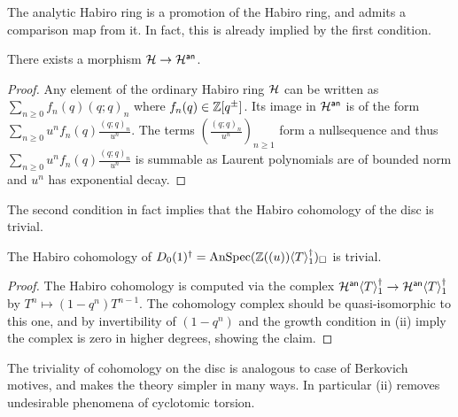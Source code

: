 The analytic Habiro ring is a promotion of the Habiro ring, and admits a comparison map from it. In fact, this is already implied by the first condition. 
\begin{lemma}\label{lem: map from Habiro to analytic Habiro}
    There exists a morphism $\mathcal{H}\to\mathcal{H}^{\mathsf{an}}$. 
\end{lemma}
\begin{proof}
    Any element of the ordinary Habiro ring $\mathcal{H}$ can be written as $\sum_{n\geq0}f_{n}(q)(q;q)_{n}$ where $f_{n}(q)\in\mathbb{Z}[q^{\pm}]$. Its image in $\mathcal{H}^{\mathsf{an}}$ is of the form $\sum_{n\geq0}u^{n}f_{n}(q)\frac{(q;q)_{n}}{u^{n}}$. The terms $\left(\frac{(q;q)_{n}}{u^{n}}\right)_{n\geq1}$ form a nullsequence and thus $\sum_{n\geq0}u^{n}f_{n}(q)\frac{(q;q)_{n}}{u^{n}}$ is summable as Laurent polynomials are of bounded norm and $u^{n}$ has exponential decay. 
\end{proof}
The second condition in fact implies that the Habiro cohomology of the disc is trivial.
\begin{proposition}
    The Habiro cohomology of $D_{0}(1)^{\dagger}=\mathrm{AnSpec}(\mathbb{Z}((u))\langle T\rangle_{1}^{\dagger})_{\square}$ is trivial. 
\end{proposition} 
\begin{proof}
    The Habiro cohomology is computed via the complex $\mathcal{H}^{\mathsf{an}}\langle T\rangle^{\dagger}_{1}\to\mathcal{H}^{\mathsf{an}}\langle T\rangle^{\dagger}_{1}$ by $T^{n}\mapsto (1-q^{n})T^{n-1}$. The cohomology complex should be quasi-isomorphic to this one, and by invertibility of $(1-q^{n})$ and the growth condition in (ii) imply the complex is zero in higher degrees, showing the claim. 
\end{proof}
The triviality of cohomology on the disc is analogous to case of Berkovich motives, and makes the theory simpler in many ways. In particular (ii) removes undesirable phenomena of cyclotomic torsion. 

